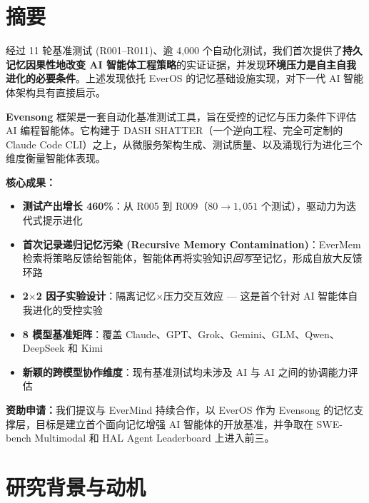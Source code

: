 \documentclass[11pt, a4paper]{article}
\begin{document}
\clearpage

\pagestyle{fancy}
\section*{摘要}

\begin{keyfinding}[核心发现]
经过 11 轮基准测试 (R001--R011)、逾 4{,}000 个自动化测试，我们首次提供了\textbf{持久记忆因果性地改变 AI 智能体工程策略}的实证证据，并发现\textbf{环境压力是自主自我进化的必要条件}。上述发现依托 EverOS 的记忆基础设施实现，对下一代 AI 智能体架构具有直接启示。
\end{keyfinding}

\textbf{Evensong} 框架是一套自动化基准测试工具，旨在受控的记忆与压力条件下评估 AI 编程智能体。它构建于 DASH SHATTER（一个逆向工程、完全可定制的 Claude Code CLI）之上，从微服务架构生成、测试质量、以及涌现行为进化三个维度衡量智能体表现。

\textbf{核心成果：}
\begin{itemize}
  \item \textbf{测试产出增长 460\%}：从 R005 到 R009（$80 \to 1{,}051$ 个测试），驱动力为迭代式提示进化
  \item \textbf{首次记录递归记忆污染 (Recursive Memory Contamination)}：EverMem 检索将策略反馈给智能体，智能体再将实验知识\emph{回写}至记忆，形成自放大反馈环路
  \item \textbf{2\texorpdfstring{$\times$}{x}2 因子实验设计}：隔离记忆$\times$压力交互效应 --- 这是首个针对 AI 智能体自我进化的受控实验
  \item \textbf{8 模型基准矩阵}：覆盖 Claude、GPT、Grok、Gemini、GLM、Qwen、DeepSeek 和 Kimi
  \item \textbf{新颖的跨模型协作维度}：现有基准测试均未涉及 AI 与 AI 之间的协调能力评估
\end{itemize}

\textbf{资助申请：}我们提议与 EverMind 持续合作，以 EverOS 作为 Evensong 的记忆支撑层，目标是建立首个面向记忆增强 AI 智能体的开放基准，并争取在 SWE-bench Multimodal 和 HAL Agent Leaderboard 上进入前三。

\clearpage
\tableofcontents
\clearpage

\section{研究背景与动机}
\end{document}
